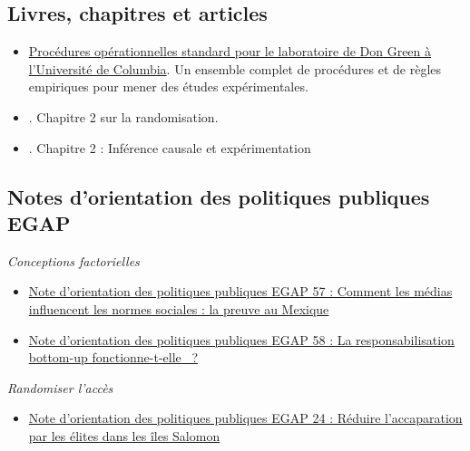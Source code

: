 \documentclass[12pt,]{book}
\providecommand{\tightlist}{%
  \setlength{\itemsep}{0pt}\setlength{\parskip}{0pt}}
\begin{document}
\hypertarget{livres-chapitres-et-articles-1}{%
\subsection{Livres, chapitres et articles}\label{livres-chapitres-et-articles-1}}

\begin{itemize}
\item
  \href{https://github.com/acoppock/Green-Lab-SOP}{Procédures opérationnelles standard pour le laboratoire de Don Green à l'Université de Columbia}. Un ensemble complet de procédures et de règles empiriques pour mener des études expérimentales.
\item
  \autocite{glennerster_running_2013}. Chapitre 2 sur la randomisation.
\item
  \autocite{gerber_field_2012}. Chapitre 2 : Inférence causale et expérimentation
\end{itemize}

\hypertarget{notes-dorientation-des-politiques-publiques-egap-1}{%
\subsection{Notes d'orientation des politiques publiques EGAP}\label{notes-dorientation-des-politiques-publiques-egap-1}}

\emph{Conceptions factorielles}

\begin{itemize}
\item
  \href{https://egap.org/resource/how-media-influence-social-norms-evidence-from-mexico/}{Note d'orientation des politiques publiques EGAP 57 : Comment les médias influencent les normes sociales : la preuve au Mexique}
\item
  \href{https://egap.org/resource/does-bottom-up-accountability-work-evidence-from-uganda/}{Note d'orientation des politiques publiques EGAP 58 : La responsabilisation bottom-up fonctionne-t-elle~ ?}
\end{itemize}

\emph{Randomiser l'accès}

\begin{itemize}
\tightlist
\item
  \href{https://egap.org/resource/brief-24-reducing-elite-capture-in-the-solomon-islands/}{Note d'orientation des politiques publiques EGAP 24 : Réduire l'accaparation par les élites dans les îles Salomon}
\end{itemize}
\end{document}
